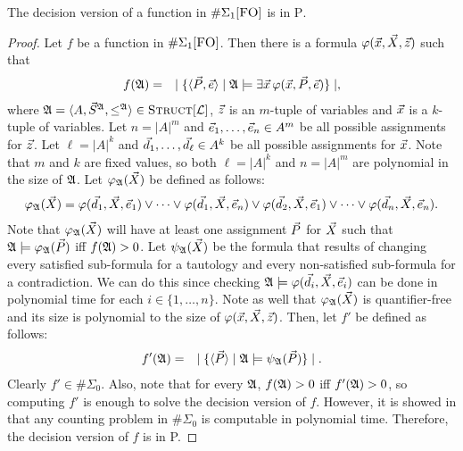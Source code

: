 \begin{theo} \label{decisionptime}
The decision version of a function in $\E1$ is in \textsc{P}.
\end{theo}
\begin{proof}
Let $f$ be a function in $\E1$. Then there is a formula $\varphi(\x,\X,\z)$ such that
\begin{eqnarray*}
f(\A) &=& \mid \{ \langle\P,\e\rangle \mid \A \models \exists \x \, \varphi(\x,\P,\e) \} \mid,
\end{eqnarray*}
where $\A = \langle A, \S^{\A}, \leq^{\A} \rangle \in \Truc$, $\z$ is an $m$-tuple of variables and $\x$ is a $k$-tuple of variables. Let $n = \vert A \vert^m$ and $\e_1,\dots,\e_n \in A^m$ be all possible assignments for $\z$. Let $\ell = \vert A \vert^k$ and $\d_1,\dots,\d_\ell\in A^k$ be all possible assignments for $\x$. Note that $m$ and $k$ are fixed values, so both $\ell = \vert A \vert^k$ and $n=\vert A \vert^m$ are polynomial in the size of $\A$. Let $\varphi_\A(\X)$ be defined as follows:
\begin{eqnarray*}
\varphi_\A(\X) = \varphi(\d_1,\X,\e_1) \vee \cdots \vee \varphi(\d_1,\X,\e_n) \vee \varphi(\d_2,\X,\e_1) \vee \cdots \vee \varphi(\d_n,\X,\e_n).
\end{eqnarray*}
Note that $\varphi_\A(\X)$ will have at least one assignment $\P$ for $\X$ such that $\A\models\varphi_\A(\P)$ iff $f(\A)>0$. Let $\psi_\A(\X)$ be the formula that results of changing every satisfied sub-formula for a tautology and every non-satisfied sub-formula for a contradiction. We can do this since checking $\A\models\varphi(\d_i,\X,\e_i)$ can be done in polynomial time for each $i\in\{1,\ldots,n\}$. Note as well that $\varphi_\A(\X)$ is quantifier-free and its size is polynomial to the size of $\varphi(\x,\X,\z)$. Then, let $f'$ be defined as follows:
\begin{eqnarray*}
f'(\A) &=& \mid \{ \langle\P\rangle \mid \A \models \psi_\A(\P) \} \mid.
\end{eqnarray*}
Clearly $f' \in\#\Sigma_0$. Also, note that for every $\A$, $f(\A) > 0$ iff $f'(\A) > 0$, so computing $f'$ is enough to solve the decision version of $f$. However, it is showed in \cite{DBLP:journals/jcss/SalujaST95} that any counting problem in $\#\Sigma_0$ is computable in polynomial time. Therefore, the decision version of $f$ is in {\sc P}.
\end{proof}